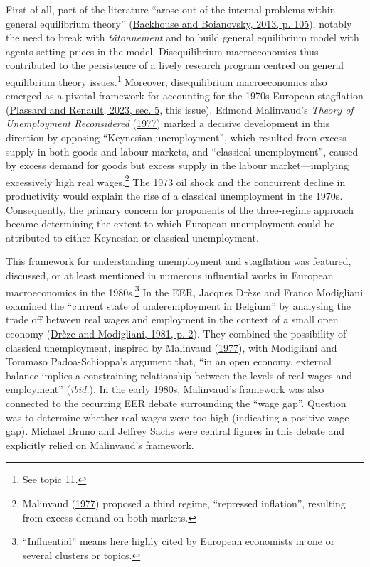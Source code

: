 \documentclass[
  12pt,
  onecolumn]{article}
\begin{document}
First of all, part of the literature ``arose out of the internal problems within general equilibrium theory'' (\protect\hyperlink{ref-backhouseboianovski2013}{Backhouse and Boianovsky, 2013, p. 105}), notably the need to break with \emph{tâtonnement} and to build general equilibrium model with agents setting prices in the model. Disequilibrium macroeconomics thus contributed to the persistence of a lively research program centred on general equilibrium theory issues.\footnote{See topic 11.} Moreover, disequilibrium macroeconomics also emerged as a pivotal framework for accounting for the 1970s European stagflation (\protect\hyperlink{ref-plassard2023}{Plassard and Renault, 2023, sec. 5}, this issue). Edmond Malinvaud's \emph{Theory of Unemployment Reconsidered} (\protect\hyperlink{ref-malinvaud1977}{1977}) marked a decisive development in this direction by opposing ``Keynesian unemployment'', which resulted from excess supply in both goods and labour markets, and ``classical unemployment'', caused by excess demand for goods but excess supply in the labour market---implying excessively high real wages.\footnote{Malinvaud (\protect\hyperlink{ref-malinvaud1977}{1977}) proposed a third regime, ``repressed inflation'', resulting from excess demand on both markets.} The 1973 oil shock and the concurrent decline in productivity would explain the rise of a classical unemployment in the 1970s. Consequently, the primary concern for proponents of the three-regime approach became determining the extent to which European unemployment could be attributed to either Keynesian or classical unemployment.

This framework for understanding unemployment and stagflation was featured, discussed, or at least mentioned in numerous influential works in European macroeconomics in the 1980s.\footnote{``Influential'' means here highly cited by European economists in one or several clusters or topics.} In the EER, Jacques Drèze and Franco Modigliani examined the ``current state of underemployment in Belgium'' by analysing the trade off between real wages and employment in the context of a small open economy (\protect\hyperlink{ref-dreze1981}{Drèze and Modigliani, 1981, p. 2}). They combined the possibility of classical unemployment, inspired by Malinvaud (\protect\hyperlink{ref-malinvaud1977}{1977}), with Modigliani and Tommaso Padoa-Schioppa's argument that, ``in an open economy, external balance implies a constraining relationship between the levels of real wages and employment'' (\emph{ibid.}). In the early 1980s, Malinvaud's framework was also connected to the recurring EER debate surrounding the ``wage gap''. Question was to determine whether real wages were too high (indicating a positive wage gap). Michael Bruno and Jeffrey Sachs were central figures in this debate and explicitly relied on Malinvaud's framework.
\end{document}
